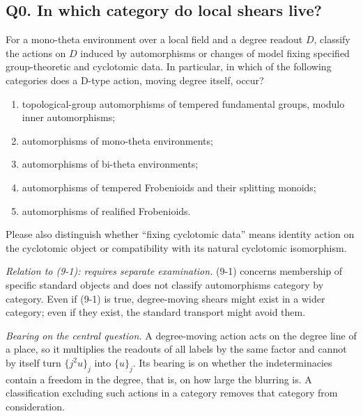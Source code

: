 \documentclass[11pt]{article}
\theoremstyle{definition}
\begin{document}
\subsection*{Q0. In which category do local shears live?}

For a mono-theta environment over a local field and a degree
readout $D$, classify the actions on $D$ induced by automorphisms
or changes of model fixing specified group-theoretic and
cyclotomic data.  In particular, in which of the following
categories does a D-type action, moving degree itself, occur?
\begin{enumerate}[leftmargin=*]
\item topological-group automorphisms of tempered fundamental groups, modulo inner automorphisms;
\item automorphisms of mono-theta environments;
\item automorphisms of bi-theta environments;
\item automorphisms of tempered Frobenioids and their splitting monoids;
\item automorphisms of realified Frobenioids.
\end{enumerate}
Please also distinguish whether ``fixing cyclotomic data'' means
identity action on the cyclotomic object or compatibility with
its natural cyclotomic isomorphism.

\emph{Relation to (9-1): requires separate examination.}  (9-1)
concerns membership of specific standard objects and does not
classify automorphisms category by category.  Even if (9-1) is
true, degree-moving shears might exist in a wider category; even
if they exist, the standard transport might avoid them.

\emph{Bearing on the central question.}  A degree-moving action acts on
the degree line of a place, so it multiplies the readouts of all
labels by the same factor and cannot by itself turn $\{j^2u\}_j$ into
$\{u\}_j$.  Its bearing is on whether the indeterminacies contain a
freedom in the degree, that is, on how large the blurring is.  A
classification excluding such actions in a category removes that
category from consideration.
\end{document}
